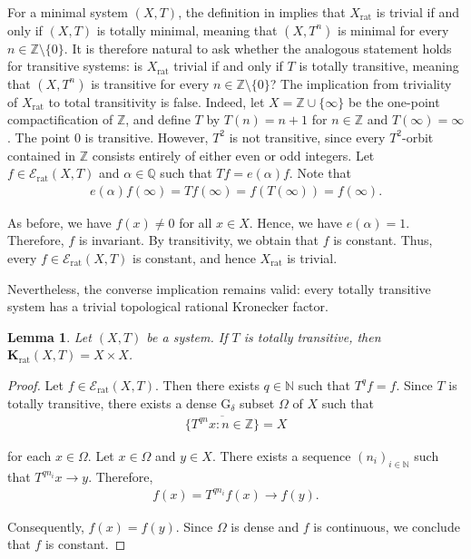 \documentclass[11pt,reqno]{amsart}
\newcommand{\Q}{\mathbb{Q}}
\newcommand{\Z}{\mathbb{Z}}
\newcommand{\N}{\mathbb{N}}
\newcommand{\Krat}{\mathbf{K}_{\operatorname{rat}}}
\newtheorem{lemma}[lemma]{Lemma}
\theoremstyle{definition}
\theoremstyle{remark}
\begin{document}
For a minimal system $(X,T)$, the definition in \cite{Glasscock_Koutsogiannis_Richter_mult_comb_return:2019} implies that $X_{\operatorname{rat}}$ is trivial if and only if $(X,T)$ is totally minimal, meaning that $(X,T^n)$ is minimal for every $n\in\Z\setminus\{0\}$. It is therefore natural to ask whether the analogous statement holds for transitive systems: is $X_{\operatorname{rat}}$ trivial if and only if $T$ is totally transitive, meaning that $(X,T^n)$ is transitive for every $n\in\Z\setminus\{0\}$? The implication from triviality of $X_{\operatorname{rat}}$ to total transitivity is false. Indeed, let $X=\Z\cup\{\infty\}$ be the one-point compactification of $\Z$, and define $T$ by $T(n)=n+1$ for $n\in\Z$ and $T(\infty)=\infty$. The point $0$ is transitive. However, $T^2$ is not transitive, since every $T^2$-orbit contained in $\Z$ consists entirely of either even or odd integers. Let $f\in \mathcal{E}_{\operatorname{rat}}(X,T)$ and $\alpha\in\Q$ such that $Tf=e(\alpha)f$. Note that \begin{align*}
    e(\alpha) f(\infty)=Tf(\infty) = f(T(\infty))=f(\infty).
\end{align*}

As before, we have $f(x)\neq 0$ for all $x\in X$. Hence, we have $e(\alpha)=1$. Therefore, $f$ is invariant. By transitivity, we obtain that $f$ is constant. Thus, every $f\in \mathcal{E}_{\operatorname{rat}}(X,T)$ is constant, and hence $X_{\operatorname{rat}}$ is trivial.

Nevertheless, the converse implication remains valid: every totally transitive system has a trivial topological rational Kronecker factor.

\begin{lemma}
    Let $(X,T)$ be a system. If $T$ is totally transitive, then $\Krat(X,T)=X\times X$.
\end{lemma}

\begin{proof}
    Let $f\in \mathcal{E}_{\operatorname{rat}}(X,T)$. Then there exists $q\in \N$ such that $T^{q}f=f$. Since $T$ is totally transitive, there exists a dense G$_\delta$ subset $\Omega$ of $X$ such that \begin{align*}
        \overline{\{T^{qn}x:n\in\Z\}} =X
    \end{align*}

    for each $x\in \Omega$. Let $x\in \Omega$ and $y\in X$. There exists a sequence $(n_i)_{i\in\N}$ such that $T^{qn_i}x\to y$. Therefore,\begin{align*}
        f(x) = T^{qn_i} f(x) \to f(y).
    \end{align*}

    Consequently, $f(x)=f(y)$. Since $\Omega$ is dense and $f$ is continuous, we conclude that $f$ is constant. 
\end{proof}
\end{document}
